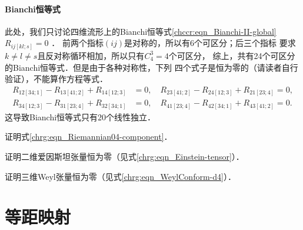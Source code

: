 

\paragraph{Bianchi恒等式}\label{chrg:sec_NumOfBianchi}
此处，我们只讨论四维流形上的Bianchi恒等式\eqref{chccr:eqn_Bianchi-II-global}$R_{ij[kl;s]} = 0$ ．
前两个指标$(ij)$是对称的，所以有6个可区分；后三个指标
要求$k\neq l \neq s$且反对称循环相加，所以只有$C_4^3=4$个可区分，
综上，共有24个可区分的Bianchi恒等式．但是由于各种对称性，下列
四个式子是恒为零的（请读者自行验证），不能算作方程等式．
\begin{equation*}
    \begin{aligned}
        R_{12[34;1]} - R_{13[41;2]} + R_{14[12;3]} &=0,  \quad
        R_{23[41;2]} - R_{24[12;3]} + R_{21[23;4]} =0,  \\
        R_{34[12;3]} - R_{31[23;4]} + R_{32[34;1]} &=0,  \quad
        R_{41[23;4]} - R_{42[34;1]} + R_{43[41;2]} =0.
    \end{aligned}
\end{equation*}
这导致Bianchi恒等式只有20个线性独立．


\begin{exercise}
	证明式\eqref{chrg:eqn_Riemannian04-component}．
\end{exercise}

\begin{exercise}
	证明二维爱因斯坦张量恒为零（见式\eqref{chrg:eqn_Einstein-tensor}）．
\end{exercise}

\begin{exercise}
	证明三维Weyl张量恒为零（见式\eqref{chrg:eqn_WeylConform-d4}）．
\end{exercise}




\section{等距映射}\label{chrg:sec_isometry}

